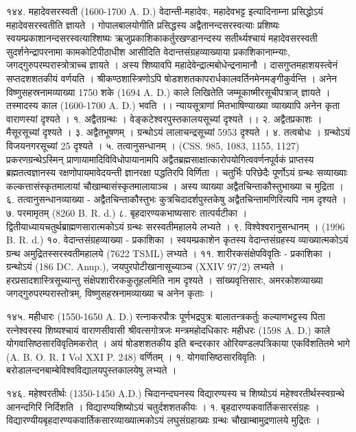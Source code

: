 १४४. महादेवसरस्वती (1600-1700 A. D.)
वेदान्ती-महादेवः, महादेवभट्ट इत्यादिनाम्ना प्रसिद्धोऽयं महादेवसरस्वतीति ज्ञायते । गोपालबालयोगीति प्रसिद्धस्य अद्वैतानन्दसरस्वत्याः प्रशिष्यः स्वयम्प्रकाशानन्दसरस्वत्याश्शिष्यः ऋजुप्रकाशिकाकर्तुरखण्डानन्दस्य सतीर्थ्यश्चायं महादेवसरस्वती सुदर्शनेन्द्रापरनामा कामकोटिपीठाधीश आसीदिति वेदान्तसंग्रहव्याख्याया प्रकाशिकानाम्न्याः, जगद्गुरुपरम्परास्त्रोत्राच्च ज्ञायते । अस्य शिष्यावपि महादेवेन्द्रात्मबोधेन्द्रनामानौ । दासगुप्तमहाशयस्त्वेनं सप्तदशशतकीयं वर्णयति । श्रीकण्ठशास्त्रिणोऽपि षोडशशतकापरार्धकालवर्तिनमेनमङ्गीकुर्वन्ति । अनेन विष्णुसहस्रनामव्याख्या 1750 शके (1694 A. D.) काले लिखितेति जम्मूकाष्मीरसूचीपत्राज् ज्ञायते । तस्मादस्य काल (1600-1700 A. D.) भवति ।। न्यायसूत्राणां मितभाषिण्याख्या व्याख्यापि अनेन कृता वाराणस्यां दृश्यते ।
१. अद्वैतग्रन्थः । वेङ्कटेश्वरपुस्तकालयसूच्यां दृश्यते ।।
२. अद्वैतप्रकाशः । मैसूरसूच्यां दृश्यते ।
३. अद्वैतभूषणम् । ग्रन्थोऽयं लालाचन्द्रसूच्यां 5953 दृश्यते ।
४. तत्वबोधः । ग्रन्थोऽयं विजयनगरसूच्यां 25 दृश्यते ।
५. तत्वानुसन्धानम् । (CSS. 985, 1083, 1155, 1127)
प्रकरणग्रन्थेऽस्मिन् प्राणायामादिविविधोपायानामपि अद्वैतब्रह्मसाक्षात्कारोपयोगित्ववर्णनपूर्वकं प्राप्तस्य ब्रह्मतत्वज्ञानस्य रक्षणोपायमावेदयन्ती ज्ञानरक्षा पद्धतिरपि विर्णिता । चतुर्भिः परिछेदैः पूर्णोऽयं ग्रन्थः सव्याख्याः कल्कत्तासंस्कृतमालायां चौखाम्बासंस्कृतमालायाञ्च । अस्य व्याख्या अद्वैतचिन्ताकौस्तुभाख्या च मुद्रिता ।
६. तत्वानुसन्धानव्याख्या - अद्वैतचिन्ताकौस्तुभः 
कुत्रचिदादर्शपुस्तकेषु अद्वैतचिन्तामणिरित्यपि नाम दृश्यते ।
७. परमामृतम् (8260 B. R. d.)
८. बृहदारण्यकभाष्यसारः तात्पर्यटीका । द्वितीयाध्यायचतुर्थब्राह्मणसारात्मकोऽयं ग्रन्थः सरस्वतीमहालये लभ्यते ।
९. विश्वेश्वरानुसन्धानम् । (1996 B. R. d.)
१०. वेदान्तसंग्रहव्याख्या - प्रकाशिका । स्वयम्प्रकाशेन कृतस्य वेदान्तसंग्रहस्य व्याख्यात्मकोऽयं ग्रन्थ अमुद्रितस्सरस्वतीमहालये (7622 TSML) लभ्यते ।
११. शारीरकसंक्षेपविवृतिः - प्रकाशिका । ग्रन्थोऽयं (186 DC. Anup.), जयपुरपोटीखानासूच्याञ्च (XXIV 97/2) लभ्यते । हरप्रसादशास्त्रिसूच्यान्तु संक्षेपशारीरककुतूहलमिति नाम दृश्यते । सांख्यवृत्तिसारः, अमरकोशव्याख्या जगद्गुरुपरम्परास्तोत्रम्, विष्णुसहस्रनामव्याख्या च अनेन कृताः ।

१४५. महीधारः (1550-1650 A. D.)
रत्नाकरपौत्रः पूर्णभद्रपुत्रः बालातन्त्रकर्तुः कल्याणभट्टस्य पिता रत्नेश्वरस्य शिष्यश्चायं वाराणसीवासी श्रीवत्सगोत्रजः मन्त्रमहोदधिकारः महीधरः (1598 A. D.) काले योगवासिष्ठसारविवृतिमकरोत् । अयं षोडशशतकीय इति बन्दरकार ओरियण्डलपत्रिकाया एकविंशतितमे भागे (A. B. O. R. I Vol XXI P. 248) वर्णितम् ।
१. योगवासिष्ठसारविवृतिः । बरोडालन्दनबाम्बेविश्वविद्यालयपुस्तकालयेषु लभ्यते ।

१४६.
महेश्वरतीर्थः (1350-1450 A.D.)
चिदानन्दघनस्य विद्यारण्यस्य च शिष्योऽयं महेश्वरतीर्थस्स्वग्रन्थे आनन्दगिरिं निर्दिशति । विद्यारण्यशिष्योऽयं चतुर्दशशतकीयः ।
१. बृहदारण्यकवार्तिकसारसंग्रहः । विद्यारण्यीयबृहदारण्यकवार्तिकसारव्याख्यात्मकोऽयं लघुसंग्रहाख्यः ग्रन्थः चौखाम्बामुद्रणालये मुद्रितः ।

